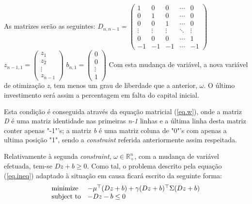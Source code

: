 \documentclass[a4paper]{IEEEtran}
\begin{document}
As matrizes serão as seguintes:
\vskip 4mm
$D_{n,n-1} = 
 \begin{pmatrix}
  1 & 0 & 0 & \cdots & 0 \\
  0 & 1 & 0 & \cdots & 0 \\
  0 & 0 & 1 & \cdots & 0 \\
  \vdots & \vdots & \vdots & \ddots & \vdots \\
  0 & 0 & 0 & \cdots & 1 \\
  -1 & -1 &-1 & \cdots & -1
 \end{pmatrix}
$
\vskip 4mm
$z_{n-1,1} = 
\begin{pmatrix}
  z_{1} \\
  z_{2}\\
  \vdots  \\
  z_{n-1}  
 \end{pmatrix}
$ \: \: \: \: \: \: \:
$
b_{n,1} = 
\begin{pmatrix}
  0 \\
  0\\
  \vdots  \\
  1  
 \end{pmatrix}
$
\vskip 4mm
Com esta mudança de variável, a nova variável de otimização \textit{z}, tem menos um grau de liberdade que a anterior, $\omega$. O último investimento será assim a percentagem em falta do capital inicial. 

Esta condição é conseguida através da equação matricial (\ref{eq.w}), onde a matriz \textit{D} é uma matriz identidade nas primeiras \textit{n-1} linhas e a última linha desta matriz conter apenas "-1"'s; a matriz \textit{b} é uma matriz coluna de "0"'s com  apenas a ultima posição "1", sendo a \textit{constraint} referida anteriormente assim respeitada.

Relativamente à segunda \textit{constraint}, $\omega \in \mathbb{R}_+^n$, com a mudança de variável efetuada, tem-se $D z + b \geq 0$. Como tal, o problema descrito pela equação (\ref{eq.ineq}) adaptado à situação em causa ficará escrito da seguinte forma:
\begin{equation}
\label{eq.subs}
\begin{array}[t]{ll} \text{minimize} & -\mu^\top (D z + b) + \gamma (D z + b)^\top \Sigma (D z + b) \\
\text{subject to} & -D z - b \leq 0 \end{array}
\end{equation}
\end{document}
